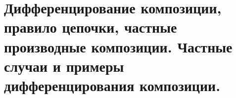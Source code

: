 \documentclass[../main.tex]{subfiles}
\begin{document}
\newpage
\section{Дифференцирование композиции, правило цепочки, частные производные композиции. Частные случаи и примеры дифференцирования композиции.}
\end{document}
